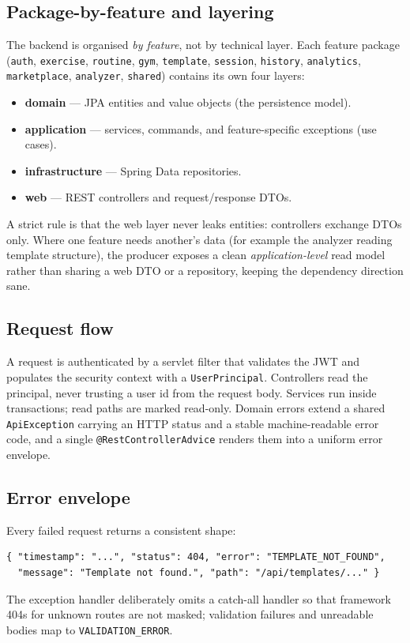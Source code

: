\documentclass[11pt,a4paper]{article}
\begin{document}
\subsection{Package-by-feature and layering}
The backend is organised \emph{by feature}, not by technical layer. Each feature package
(\verb|auth|, \verb|exercise|, \verb|routine|, \verb|gym|, \verb|template|, \verb|session|,
\verb|history|, \verb|analytics|, \verb|marketplace|, \verb|analyzer|, \verb|shared|) contains its
own four layers:
\begin{itemize}[noitemsep]
  \item \textbf{domain} --- JPA entities and value objects (the persistence model).
  \item \textbf{application} --- services, commands, and feature-specific exceptions (use cases).
  \item \textbf{infrastructure} --- Spring Data repositories.
  \item \textbf{web} --- REST controllers and request/response DTOs.
\end{itemize}
A strict rule is that the web layer never leaks entities: controllers exchange DTOs only. Where
one feature needs another's data (for example the analyzer reading template structure), the
producer exposes a clean \emph{application-level} read model rather than sharing a web DTO or a
repository, keeping the dependency direction sane.

\subsection{Request flow}
A request is authenticated by a servlet filter that validates the JWT and populates the security
context with a \verb|UserPrincipal|. Controllers read the principal, never trusting a user id from
the request body. Services run inside transactions; read paths are marked read-only. Domain errors
extend a shared \verb|ApiException| carrying an HTTP status and a stable machine-readable error
code, and a single \verb|@RestControllerAdvice| renders them into a uniform error envelope.

\subsection{Error envelope}
Every failed request returns a consistent shape:
\begin{lstlisting}
{ "timestamp": "...", "status": 404, "error": "TEMPLATE_NOT_FOUND",
  "message": "Template not found.", "path": "/api/templates/..." }
\end{lstlisting}
The exception handler deliberately omits a catch-all handler so that framework 404s for unknown
routes are not masked; validation failures and unreadable bodies map to \verb|VALIDATION_ERROR|.
\end{document}
